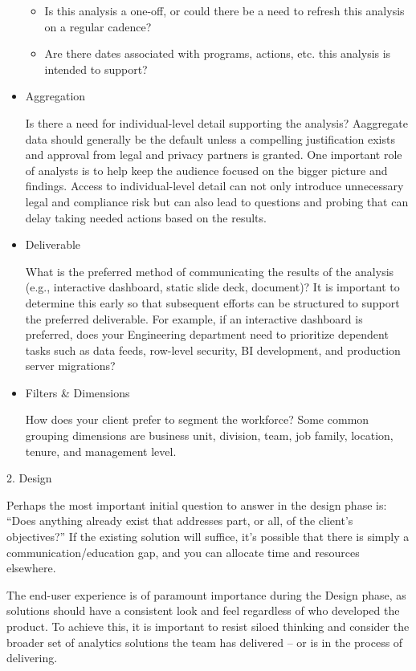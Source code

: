\documentclass[]{book}
\providecommand{\tightlist}{%
  \setlength{\itemsep}{0pt}\setlength{\parskip}{0pt}}
\begin{document}
\begin{itemize}
  \begin{itemize}
  \tightlist
  \item
    Is this analysis a one-off, or could there be a need to refresh this analysis on a regular cadence?
  \item
    Are there dates associated with programs, actions, etc. this analysis is intended to support?
  \end{itemize}
\item
  Aggregation

  Is there a need for individual-level detail supporting the analysis? Aaggregate data should generally be the default unless a compelling justification exists and approval from legal and privacy partners is granted. One important role of analysts is to help keep the audience focused on the bigger picture and findings. Access to individual-level detail can not only introduce unnecessary legal and compliance risk but can also lead to questions and probing that can delay taking needed actions based on the results.
\item
  Deliverable

  What is the preferred method of communicating the results of the analysis (e.g., interactive dashboard, static slide deck, document)? It is important to determine this early so that subsequent efforts can be structured to support the preferred deliverable. For example, if an interactive dashboard is preferred, does your Engineering department need to prioritize dependent tasks such as data feeds, row-level security, BI development, and production server migrations?
\item
  Filters \& Dimensions

  How does your client prefer to segment the workforce? Some common grouping dimensions are business unit, division, team, job family, location, tenure, and management level.
\end{itemize}

2. Design

Perhaps the most important initial question to answer in the design phase is: ``Does anything already exist that addresses part, or all, of the client's objectives?'' If the existing solution will suffice, it's possible that there is simply a communication/education gap, and you can allocate time and resources elsewhere.

The end-user experience is of paramount importance during the Design phase, as solutions should have a consistent look and feel regardless of who developed the product. To achieve this, it is important to resist siloed thinking and consider the broader set of analytics solutions the team has delivered -- or is in the process of delivering.
\end{document}
